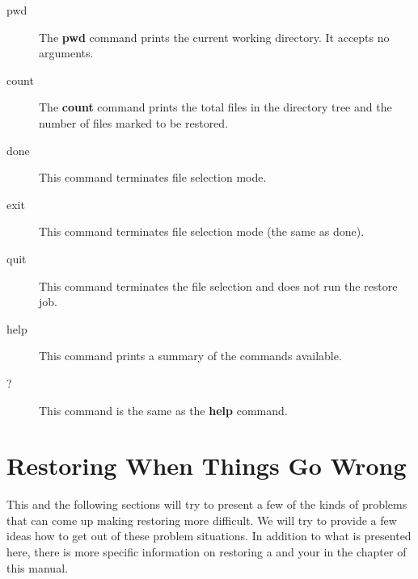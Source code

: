 \begin{description}
\item [pwd]
   The {\bf pwd} command prints the current working  directory. It accepts no
   arguments.  

\item [count]
   The {\bf count} command prints the total files in the  directory tree and the
   number of files marked to be restored.  

\item [done]
   This command terminates file selection mode.  

\item [exit]
   This command terminates file selection mode (the same as  done).  

\item [quit]
   This command terminates the file selection and does  not run the restore
job. 


\item [help]
   This command prints a summary of the commands available.  

\item [?]
   This command is the same as the {\bf help} command.  
\end{description}

\label{database_restore}
\section{Restoring When Things Go Wrong}

This and the following sections will try to present a few of the kinds of
problems that can come up making restoring more difficult. We will try to
provide a few ideas how to get out of these problem situations.
In addition to what is presented here, there is more specific information
on restoring a  and your
 in the  chapter of this manual.

